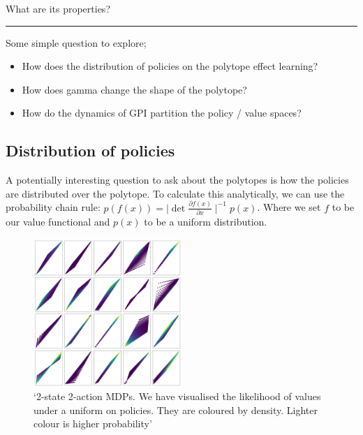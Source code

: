 What are its properties?

\begin{center}\rule{0.5\linewidth}{\linethickness}\end{center}

Some simple question to explore;

\begin{itemize}
\item
  How does the distribution of policies on the polytope effect learning?
\item
  How does gamma change the shape of the polytope?
\item
  How do the dynamics of GPI partition the policy / value spaces?
\end{itemize}

\subsection{Distribution of policies}

A potentially interesting question to ask about the polytopes is how the
policies are distributed over the polytope. To calculate this
analytically, we can use the probability chain rule:
\(p(f(x)) = \mid \det\frac{\partial f(x)}{\partial x}\mid^{-1}p(x)\).
Where we set \(f\) to be our value functional and \(p(x)\) to be a
uniform distribution.

\begin{figure}
\centering
\includegraphics[width=0.5\textwidth,height=0.5\textheight]{../../pictures/figures/polytope_densities.png}
\caption{`2-state 2-action MDPs. We have visualised the likelihood of
values under a uniform on policies. They are coloured by density.
Lighter colour is higher probability'}
\end{figure}

